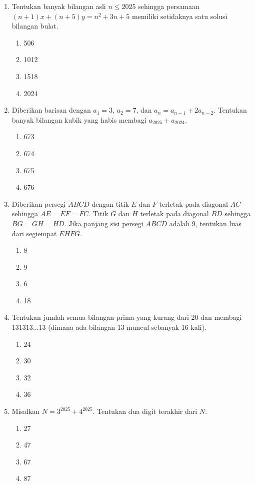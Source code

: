 \documentclass[12pt]{scrartcl}
\begin{document}
\begin{enumerate}
    \item Tentukan banyak bilangan asli $n \le 2025$ sehingga persamaan $(n+1)x+(n+5)y=n^{2}+3n+5$ memiliki setidaknya satu solusi bilangan bulat.
    \begin{enumerate}
        \item 506
        \item 1012
        \item 1518
        \item 2024
    \end{enumerate}

    \item Diberikan barisan dengan $a_{1}=3$, $a_{2}=7$, dan $a_{n}=a_{n-1}+2a_{n-2}$. Tentukan banyak bilangan kubik yang habis membagi $a_{2025}+a_{2024}$.
    \begin{enumerate}
        \item 673
        \item 674
        \item 675
        \item 676
    \end{enumerate}

    \item Diberikan persegi $ABCD$ dengan titik $E$ dan $F$ terletak pada diagonal $AC$ sehingga $AE=EF=FC$. Titik $G$ dan $H$ terletak pada diagonal $BD$ sehingga $BG=GH=HD$. Jika panjang sisi persegi $ABCD$ adalah 9, tentukan luas dari segiempat $EHFG$.
    \begin{enumerate}
        \item 8
        \item 9
        \item 6
        \item 18
    \end{enumerate}

    \item Tentukan jumlah semua bilangan prima yang kurang dari 20 dan membagi $131313\dots13$ (dimana ada bilangan 13 muncul sebanyak 16 kali).
    \begin{enumerate}
        \item 24
        \item 30
        \item 32
        \item 36
    \end{enumerate}

    \item Misalkan $N=3^{2025}+4^{2025}$. Tentukan dua digit terakhir dari $N$.
    \begin{enumerate}
        \item 27
        \item 47
        \item 67
        \item 87
    \end{enumerate}


\end{enumerate}
\end{document}
